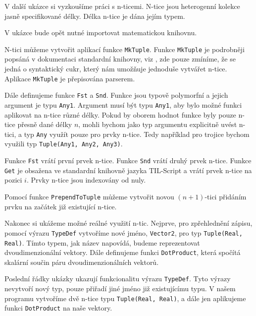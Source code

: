 V další ukázce si vyzkoušíme práci s n-ticemi. N-tice jsou heterogenní kolekce jasně specifikované
délky. Délka n-tice je dána jejím typem.

V ukázce bude opět nutné importovat matematickou knihovnu.

N-tici můžeme vytvořit aplikací funkce \lstinline{MkTuple}. Funkce \lstinline{MkTuple} je podrobněji
popsáná v dokumentaci standardní knihovny, viz , zde pouze zmíníme, že se
jedná o syntaktický cukr, který nám umožňuje jednoduše vytvářet n-tice. Aplikace \lstinline{MkTuple}
je přepisována parserem.

Dále definujeme funkce \lstinline{Fst} a \lstinline{Snd}. Funkce jsou typově polymorfní a jejich
argument je typu \lstinline{Any1}. Argument musí být typu \lstinline{Any1}, aby bylo možné funkci
aplikovat na n-tice různé délky. Pokud by oborem hodnot funkce byly pouze n-tice přesně dané délky
$n$, mohli bychom jako typ argumentu explicitně uvést n-tici, a typ \lstinline{Any} využít pouze
pro prvky n-tice. Tedy například pro trojice bychom využili typ \lstinline{Tuple(Any1, Any2, Any3)}.

Funkce \lstinline{Fst} vrátí první prvek n-tice. Funkce \lstinline{Snd} vrátí druhý prvek n-tice.
Funkce \lstinline{Get} je obsažena ve standardní knihovně jazyka TIL-Script a vrátí prvek n-tice
na pozici $i$. Prvky n-tice jsou indexovány od nuly.

Pomocí funkce \lstinline{PrependToTuple} můžeme vytvořit novou $(n+1)$-tici přidáním prvku
na začátek již existující n-tice.

Nakonec si ukážeme možné reálné využití n-tic. Nejprve, pro zpřehlednění zápisu, pomocí výrazu
\lstinline{TypeDef} vytvoříme nové jméno, \lstinline{Vector2}, pro typ
\lstinline{Tuple(Real, Real)}. Tímto typem, jak název napovídá, budeme reprezentovat
dvoudimenzionální vektory. Dále definujeme funkci \lstinline{DotProduct}, která spočítá skalární
součin páru dvoudimenzionálních vektorů.

Poslední řádky ukázky ukazují funkcionalitu výrazu \lstinline{TypeDef}. Tyto výrazy nevytvoří nový
typ, pouze přiřadí jiné jméno již existujícímu typu. V našem programu vytvoříme dvě n-tice typu
\lstinline{Tuple(Real, Real)}, a dále jen aplikujeme funkci \lstinline{DotProduct} na naše vektory.

